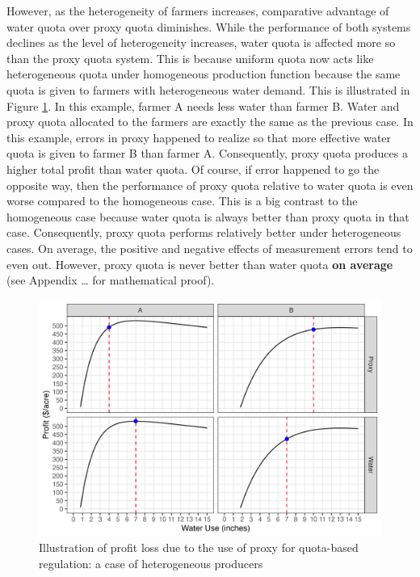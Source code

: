 \documentclass[
]{article}
\begin{document}
However, as the heterogeneity of farmers increases, comparative advantage of water quota over proxy quota diminishes. While the performance of both systems declines as the level of heterogeneity increases, water quota is affected more so than the proxy quota system. This is because uniform quota now acts like heterogeneous quota under homogeneous production function because the same quota is given to farmers with heterogeneous water demand. This is illustrated in Figure \ref{fig:illust-heterogeneous}. In this example, farmer A needs less water than farmer B. Water and proxy quota allocated to the farmers are exactly the same as the previous case. In this example, errors in proxy happened to realize so that more effective water quota is given to farmer B than farmer A. Consequently, proxy quota produces a higher total profit than water quota. Of course, if error happened to go the opposite way, then the performance of proxy quota relative to water quota is even worse compared to the homogeneous case. This is a big contrast to the homogeneous case because water quota is always better than proxy quota in that case. Consequently, proxy quota performs relatively better under heterogeneous cases. On average, the positive and negative effects of measurement errors tend to even out. However, proxy quota is never better than water quota \textbf{on average} (see Appendix \ldots{} for mathematical proof).

\begin{figure}[H]

{\centering \includegraphics{figures/g_illustration_het} 

}

\caption{Illustration of profit loss due to the use of proxy for quota-based regulation: a case of heterogeneous producers}\label{fig:illust-heterogeneous}
\end{figure}
\end{document}
